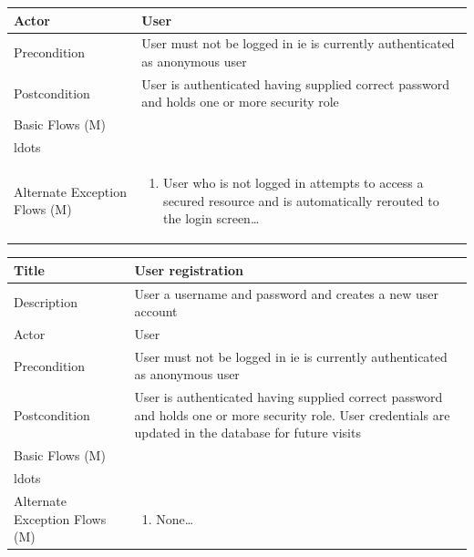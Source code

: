 \documentclass[a4paper,12pt]{article}
\newcommand\addrow[2]{#1 &#2\\ }
\newcommand\addheading[2]{#1 &#2\\ \hline}
\newcommand\tabularhead{\begin{tabular}{lp{8cm}}
\hline
}
\newcommand\addmulrow[2]{ \begin{minipage}[t][][t]{2.5cm}#1\end{minipage}%
   &\begin{minipage}[t][][t]{8cm}
    \begin{enumerate} #2   \end{enumerate}
    \end{minipage}\\ }
\newenvironment{usecase}{\tabularhead}
{\hline\end{tabular}}
\begin{document}
\begin{samepage}
\begin{usecase}
  \addheading{Actor}{User} 
  \addrow{Precondition}{User must not be logged in ie is currently authenticated as anonymous user}
  \addrow{Postcondition}{User is authenticated having supplied correct password and holds one or more security role}
  \addmulrow{Basic Flows (M)}{\item User navigates to login area via base template button which is visible on all pages\ldots
                                  \item User enters username and password and clicks login\ldots
                                  \item Controller method checks username and password against user repository. If credentials are matched to repository logs user in and set the user as authenticate, allocating any roles held by that user
                                  \item If credentials are not matched to repositoryare display login failed message and redisplay the login screen\\ldots}
  \addmulrow{Alternate Exception Flows (M)}{\item User who is not logged in attempts to access a secured resource and is automatically rerouted to the login screen\ldots}
                                  
\end{usecase}

\begin{usecase}
    \addheading{Title}{User registration}
  \addheading{Description}{User a username and password and creates a new user account}
  
  \addheading{Actor}{User} 
  \addrow{Precondition}{User must not be logged in ie is currently authenticated as anonymous user}
  \addrow{Postcondition}{User is authenticated having supplied correct password and holds one or more security role. User credentials are updated in the database for future visits}
  \addmulrow{Basic Flows (M)}{\item User navigates to register area via base template button which is shown on all pages when the user is not currently logged in \ldots
                                  \item User enters username and password and clicks login\ldots
                                  \item Controller method checks username and password against user repository. If credentials supplied are valid, and do not duplicate an existing user account the user is set to a logged in stage and the database is updated
                                  \item If credentials are matched to an existing user record in the repository display the registration failed message and redisplay the registration form screen\\ldots}
  \addmulrow{Alternate Exception Flows (M)}{\item None\ldots}
                                  

\end{usecase}
\end{samepage}
\end{document}
